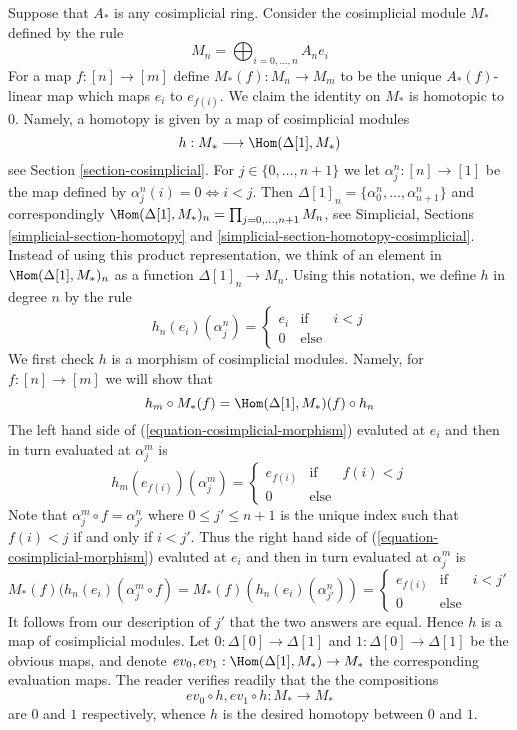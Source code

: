 \begin{example}
\label{example-cosimplicial-module}
Suppose that $A_*$ is any cosimplicial ring.
Consider the cosimplicial module $M_*$ defined by the rule
$$
M_n = \bigoplus\nolimits_{i = 0, ..., n} A_n e_i
$$
For a map $f : [n] \to [m]$ define $M_*(f) : M_n \to M_m$
to be the unique $A_*(f)$-linear map which maps $e_i$ to $e_{f(i)}$.
We claim the identity on $M_*$ is homotopic to $0$.
Namely, a homotopy is given by a map of cosimplicial modules
$$
h : M_* \longrightarrow \Hom(\Delta[1], M_*)
$$
see Section \ref{section-cosimplicial}.
For $j \in \{0, \ldots, n + 1\}$ we let $\alpha^n_j : [n] \to [1]$ be the map
defined by $\alpha^n_j(i) = 0 \Leftrightarrow i < j$. Then
$\Delta[1]_n = \{\alpha^n_0, \ldots, \alpha^n_{n + 1}\}$ and correspondingly
$\Hom(\Delta[1], M_*)_n = \prod_{j = 0, \ldots, n + 1} M_n$, see
Simplicial, Sections \ref{simplicial-section-homotopy} and
\ref{simplicial-section-homotopy-cosimplicial}. Instead of using
this product representation, we think of an element
in $\Hom(\Delta[1], M_*)_n$ as a function $\Delta[1]_n \to M_n$.
Using this notation, we define $h$ in degree $n$ by the rule
$$
h_n(e_i)(\alpha^n_j) =
\left\{
\begin{matrix}
e_{i} & \text{if} & i < j \\
0 & \text{else} 
\end{matrix}
\right.
$$
We first check $h$ is a morphism of cosimplicial modules. Namely, for
$f : [n] \to [m]$ we will show that
\begin{equation}
\label{equation-cosimplicial-morphism}
h_m \circ M_*(f) = \Hom(\Delta[1], M_*)(f) \circ h_n
\end{equation}
The left hand side of (\ref{equation-cosimplicial-morphism}) evaluted at
$e_i$ and then in turn evaluated at $\alpha^m_j$ is
$$
h_m(e_{f(i)})(\alpha^m_j) =
\left\{
\begin{matrix}
e_{f(i)} & \text{if} & f(i) < j \\
0 & \text{else}
\end{matrix}
\right.
$$
Note that $\alpha^m_j \circ f = \alpha^n_{j'}$ where
$0 \leq j' \leq n + 1$ is the unique index such that $f(i) < j$
if and only if $i < j'$. Thus the right hand side of
(\ref{equation-cosimplicial-morphism}) evaluted at $e_i$
and then in turn evaluated at $\alpha^m_j$ is
$$
M_*(f)(h_n(e_i)(\alpha^m_j \circ f) =
M_*(f)(h_n(e_i)(\alpha^n_{j'})) =
\left\{
\begin{matrix}
e_{f(i)} & \text{if} & i < j' \\
0 & \text{else} 
\end{matrix}
\right.
$$
It follows from our description of $j'$ that the two answers are equal.
Hence $h$ is a map of cosimplicial modules.
Let $0 : \Delta[0] \to \Delta[1]$ and
$1 : \Delta[0] \to \Delta[1]$ be the obvious maps, and denote
$ev_0, ev_1 : \Hom(\Delta[1], M_*) \to M_*$ the corresponding
evaluation maps. The reader verifies readily that the
the compositions
$$
ev_0 \circ h, ev_1 \circ h : M_* \longrightarrow M_*
$$
are $0$ and $1$ respectively, whence $h$ is the desired homotopy between
$0$ and $1$.
\end{example}

